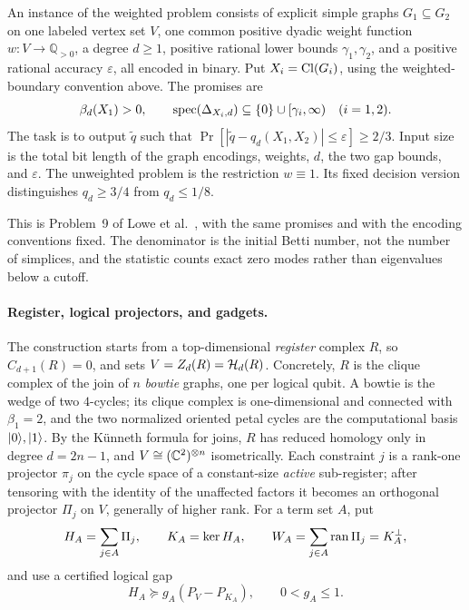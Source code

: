 \begin{definition}
\label{def:problem}
An instance of the weighted problem consists of explicit simple graphs
\(G_1\subseteq G_2\) on one labeled vertex set \(V\), one common positive
dyadic weight function \(w:V\to\mathbb Q_{>0}\), a degree \(d\ge1\), positive
rational lower bounds \(\gamma_1,\gamma_2\), and a positive rational accuracy
\(\varepsilon\), all encoded in binary.  Put \(X_i=\operatorname{Cl}(G_i)\), using the
weighted-boundary convention above.  The promises are
\[
\beta_d(X_1)>0,
\qquad
\operatorname{spec}(\Delta_{X_i,d})\subseteq\{0\}\cup[\gamma_i,\infty)
\quad(i=1,2).
\]
The task is to output \(\widetilde q\) such that
\(\Pr[|\widetilde q-q_d(X_1,X_2)|\le\varepsilon]\ge2/3\).  Input size is the
total bit length of the graph encodings, weights, \(d\), the two gap bounds,
and \(\varepsilon\).  The unweighted problem is the restriction \(w\equiv1\).
Its fixed decision version distinguishes \(q_d\ge3/4\) from \(q_d\le1/8\).
\end{definition}
This is Problem~9 of Lowe et al.~\cite{lowe2026normalized}, with the same
promises and with the encoding conventions fixed.  The denominator is the
initial Betti number, not the number of simplices, and the statistic counts
exact zero modes rather than eigenvalues below a cutoff.

\paragraph{Register, logical projectors, and gadgets.}
The construction starts from a top-dimensional \emph{register} complex
\(R\), so \(C_{d+1}(R)=0\), and sets \(V=Z_d(R)=\mathcal{H}_d(R)\).  Concretely,
\(R\) is the clique complex of the join of \(n\) \emph{bowtie} graphs, one
per logical qubit.  A bowtie is the wedge of two \(4\)-cycles; its clique
complex is one-dimensional and connected with \(\beta_1=2\), and the two
normalized oriented petal cycles are the computational basis
\(\lvert 0\rangle,\lvert 1\rangle\).  By the K\"unneth formula for joins, \(R\) has reduced
homology only in degree \(d=2n-1\), and \(V\cong(\mathbb{C}^2)^{\otimes n}\)
isometrically.  Each constraint \(j\) is a rank-one projector \(\pi_j\) on
the cycle space of a constant-size \emph{active} sub-register; after
tensoring with the identity of the unaffected factors it becomes an
orthogonal projector \(\Pi_j\) on \(V\), generally of higher rank.  For a
term set \(A\), put
\begin{equation}
\label{eq:logical-sum}
H_A=\sum_{j\in A}\Pi_j,\qquad
K_A=\ker H_A,\qquad
W_A=\sum_{j\in A}\operatorname{ran}\Pi_j=K_A^\perp ,
\end{equation}
and use a certified logical gap
\begin{equation}
\label{eq:logical-gap}
H_A\succeq g_A(P_V-P_{K_A}),\qquad 0<g_A\le1.
\end{equation}

